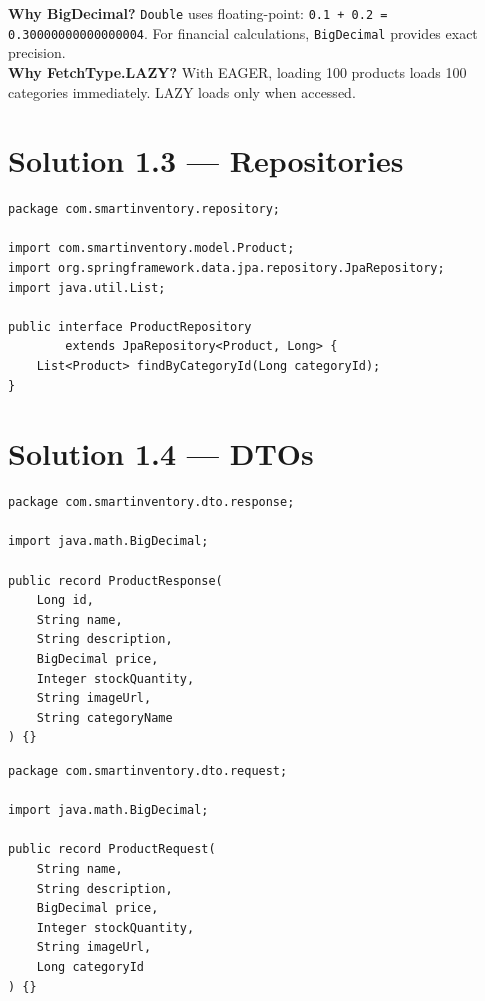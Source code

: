 \documentclass[12pt,a4paper]{report}
\begin{document}
\begin{infobox}
\textbf{Why BigDecimal?} \texttt{Double} uses floating-point: \texttt{0.1 + 0.2 = 0.30000000000000004}. For financial calculations, \texttt{BigDecimal} provides exact precision.\\[0.2cm]
\textbf{Why FetchType.LAZY?} With EAGER, loading 100 products loads 100 categories immediately. LAZY loads only when accessed.
\end{infobox}

\section{Solution 1.3 --- Repositories}

\begin{lstlisting}[style=javastyle, title={repository/ProductRepository.java}]
package com.smartinventory.repository;

import com.smartinventory.model.Product;
import org.springframework.data.jpa.repository.JpaRepository;
import java.util.List;

public interface ProductRepository
        extends JpaRepository<Product, Long> {
    List<Product> findByCategoryId(Long categoryId);
}
\end{lstlisting}

\section{Solution 1.4 --- DTOs}

\begin{lstlisting}[style=javastyle, title={dto/response/ProductResponse.java}]
package com.smartinventory.dto.response;

import java.math.BigDecimal;

public record ProductResponse(
    Long id,
    String name,
    String description,
    BigDecimal price,
    Integer stockQuantity,
    String imageUrl,
    String categoryName
) {}
\end{lstlisting}

\begin{lstlisting}[style=javastyle, title={dto/request/ProductRequest.java}]
package com.smartinventory.dto.request;

import java.math.BigDecimal;

public record ProductRequest(
    String name,
    String description,
    BigDecimal price,
    Integer stockQuantity,
    String imageUrl,
    Long categoryId
) {}
\end{lstlisting}
\end{document}

